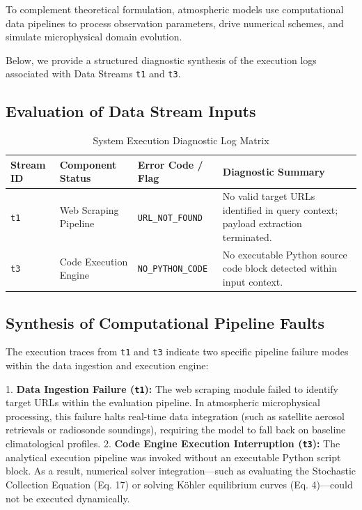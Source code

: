 \documentclass[12pt]{article}
\begin{document}
To complement theoretical formulation, atmospheric models use computational data pipelines to process observation parameters, drive numerical schemes, and simulate microphysical domain evolution.

Below, we provide a structured diagnostic synthesis of the execution logs associated with Data Streams \texttt{t1} and \texttt{t3}.

\subsection{Evaluation of Data Stream Inputs}

\begin{table}[h!]
\centering
\caption{System Execution Diagnostic Log Matrix}
\label{tab:diagnostics}
\begin{tabular}{@{}lllp{6cm}@{}}
\toprule
\textbf{Stream ID} & \textbf{Component Status} & \textbf{Error Code / Flag} & \textbf{Diagnostic Summary} \\ \midrule
\texttt{t1} & Web Scraping Pipeline & \texttt{URL\_NOT\_FOUND} & No valid target URLs identified in query context; payload extraction terminated. \\
\texttt{t3} & Code Execution Engine & \texttt{NO\_PYTHON\_CODE} & No executable Python source code block detected within input context. \\ \bottomrule
\end{tabular}
\end{table}

\subsection{Synthesis of Computational Pipeline Faults}
The execution traces from \texttt{t1} and \texttt{t3} indicate two specific pipeline failure modes within the data ingestion and execution engine:

1. \textbf{Data Ingestion Failure (\texttt{t1}):} The web scraping module failed to identify target URLs within the evaluation pipeline. In atmospheric microphysical processing, this failure halts real-time data integration (such as satellite aerosol retrievals or radiosonde soundings), requiring the model to fall back on baseline climatological profiles.
2. \textbf{Code Engine Execution Interruption (\texttt{t3}):} The analytical execution pipeline was invoked without an executable Python script block. As a result, numerical solver integration—such as evaluating the Stochastic Collection Equation (Eq. 17) or solving Köhler equilibrium curves (Eq. 4)—could not be executed dynamically.
\end{document}
